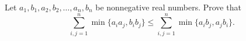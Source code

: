 Let $a_1, b_1, a_2, b_2, \dots , a_n, b_n$ be nonnegative real numbers. Prove that\[

\sum_{i, j = 1}^{n} \min\{a_ia_j, b_ib_j\} \le \sum_{i, j = 1}^{n} \min\{a_ib_j, a_jb_i\}.

\]